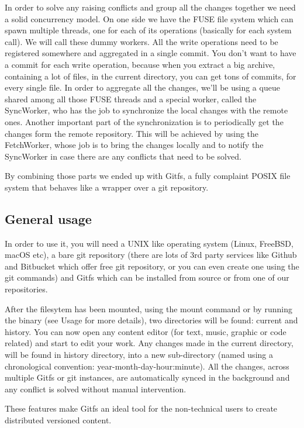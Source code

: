In order to solve any raising conflicts and group all the changes together we need a solid concurrency model. On one side we have the FUSE file system which can spawn multiple threads, one for each of its operations (basically for each system call). We will call these dummy workers. All the write operations need to be registered somewhere and aggregated in a single commit. You don't want to have a commit for each write operation, because when you extract a big archive, containing a lot of files, in the current directory, you can get tons of commits, for every single file. In order to aggregate all the changes, we'll be using a queue shared among all those FUSE threads and a special worker, called the SyncWorker, who has the job to synchronize the local changes with the remote ones. Another important part of the synchronization is to periodically get the changes form the remote repository. This will be achieved by using the FetchWorker, whose job is to bring the changes locally and to notify the SyncWorker in case there are any conflicts that need to be solved.

By combining those parts we ended up with Gitfs, a fully complaint POSIX file system \cite{Lewine1991} that behaves like a wrapper over a git repository.

\subsection{General usage}
In order to use it, you will need a UNIX like operating system (Linux, FreeBSD, macOS etc), a bare git repository (there are lots of 3rd party services like Github and Bitbucket which offer free git repository, or you can even create one using the git commands) and Gitfs which can be installed from source or from one of our repositories.

After the filesytem has been mounted, using the mount command or by running the binary (see Usage for more details), two directories will be found: current and history. You can now open any content editor (for text, music, graphic or code related) and start to edit your work. Any changes made in the current directory, will be found in history directory, into a new sub-directory (named using a chronological convention: year-month-day-hour:minute). All the changes, across multiple Gitfs or git instances, are automatically synced in the background and any conflict is solved without manual intervention.

These features make Gitfs an ideal tool for the non-technical users to create distributed versioned content.

